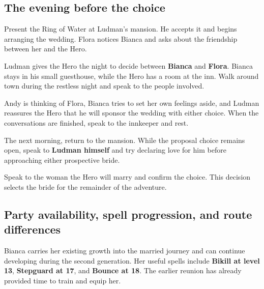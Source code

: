 \subsection*{The evening before the choice}

Present the Ring of Water at Ludman's mansion. He accepts it and
begins arranging the wedding. Flora notices Bianca and asks about
the friendship between her and the Hero.

Ludman gives the Hero the night to decide between \textbf{Bianca}
and \textbf{Flora}. Bianca stays in his small guesthouse, while
the Hero has a room at the inn. Walk around town during the restless
night and speak to the people involved.

Andy is thinking of Flora, Bianca tries to set her own feelings aside,
and Ludman reassures the Hero that he will sponsor the wedding with
either choice. When the conversations are finished, speak to the
innkeeper and rest.


The next morning, return to the mansion.
While the proposal choice remains open, speak to \textbf{Ludman himself}
and try declaring love for him before approaching either prospective bride.


Speak to the woman the Hero
will marry and confirm the choice. This decision selects the bride
for the remainder of the adventure.

\subsection{Party availability, spell progression, and route differences}

Bianca carries her existing growth into the married journey and can
continue developing during the second generation. Her useful spells
include \textbf{Bikill at level 13}, \textbf{Stepguard at 17},
and \textbf{Bounce at 18}. The earlier reunion has already provided
time to train and equip her.

